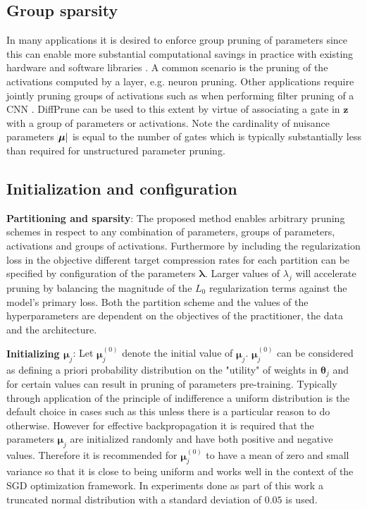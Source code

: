\documentclass[final,1p,times]{elsarticle}
\begin{document}
\subsection{Group sparsity}
In many applications it is desired to enforce group pruning of parameters since this can enable more substantial computational savings in practice with existing hardware and software libraries \cite{NIPS2016_6504}. A common scenario is the pruning of the activations computed by a layer, e.g. neuron pruning. Other applications require jointly pruning groups of activations such as when performing filter pruning of a CNN \cite{DBLP:conf/iclr/0022KDSG17}. DiffPrune can be used to this extent by virtue of associating a gate in $\mathbf{z}$ with a group of parameters or activations. Note the cardinality of nuisance parameters $\abs{\boldsymbol{\mu}}$ is equal to the number of gates which is typically substantially less than required for unstructured parameter pruning.

\subsection{Initialization and configuration}
\textbf{Partitioning and sparsity}: The proposed method enables arbitrary pruning schemes in respect to any combination of parameters, groups of parameters, activations and groups of activations. Furthermore by including the regularization loss in the objective different target compression rates for each partition can be specified by configuration of the parameters $\boldsymbol{\lambda}$. Larger values of $\lambda_j$ will accelerate pruning by balancing the magnitude of the $L_0$ regularization terms against the model's primary loss. Both the partition scheme and the values of the hyperparameters are dependent on the objectives of the practitioner, the data and the architecture. \newline

\textbf{Initializing $\boldsymbol{\mu}_j$}: Let $\boldsymbol{\mu}_j^{(0)}$ denote the initial value of $\boldsymbol{\mu}_j$. $\boldsymbol{\mu}_j^{(0)}$ can be considered as defining a priori probability distribution on the "utility" of weights in $\boldsymbol{\theta}_j$ and for certain values can result in pruning of parameters pre-training. Typically through application of the principle of indifference a uniform distribution is the default choice in cases such as this unless there is a particular reason to do otherwise. However for effective backpropagation it is required that the parameters $\boldsymbol{\mu}_j$ are initialized randomly and have both positive and negative values. Therefore it is recommended for $\boldsymbol{\mu}_j^{(0)}$ to have a mean of zero and small variance so that it is close to being uniform and works well in the context of the SGD optimization framework. In experiments done as part of this work a truncated normal distribution with a standard deviation of $0.05$ is used. \newline
\end{document}
